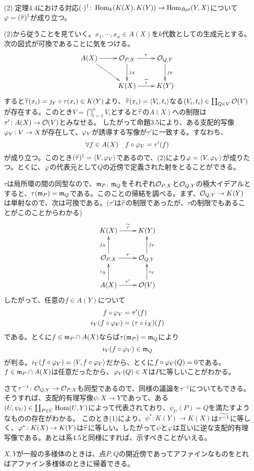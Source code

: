 \begin{description}
  (2) 定理4.4における対応$( \cdot )^{\dagger} \colon \operatorname{Hom}_{k}(K(X),K(Y)) \to \operatorname{Hom}_{Rat}(Y,X)$について${\varphi} = (\widetilde{\tau})^{\dagger} $が成り立つ。
\item[Step 2] (2)から従うことを見ていく。$x_1 , \cdots ,x_n \in A(X)$を$k$代数としての生成元とする。次の図式が可換であることに気をつける。
  \[
\xymatrix{
A(X) \ar[dr] \ar[r] & \calo_{P,X} \ar[d]^-{j_X} \ar[r]^-{\tau} & \calo_{Q,Y} \ar[d]^-{j_Y} \\
{} & K(X) \ar[r]^-{\wt{\tau}} & K(Y)
}
  \]
すると$\widetilde{\tau}(x_i) = j_Y \circ \tau(x_i) \in K(Y)$より、$\widetilde{\tau}(x_i) = \langle V_i, t_i \rangle$なる$(V_i, t_i) \in \coprod_{Q \in V} \mathcal{O}(V)$が存在する。このとき$V = \bigcap_{i=1}^n V_i$とすると$\widetilde{\tau}$の$A(X)$への制限は$\tau' \colon A(X) \to \mathcal{O}(V)$とみなせる。
したがって命題3.5により、ある支配的写像${\varphi}_V \colon V \to X$が存在して、${\varphi}_V$が誘導する写像が$\tau'$に一致する。すなわち、
\[
\forall f \in A(X) \quad f \circ {\varphi}_V = \tau'(f)
\]
が成り立つ。このとき$(\widetilde{\tau})^{\dagger} = \langle V,{\varphi}_V  \rangle$であるので、(2)により${\varphi} = \langle V,{\varphi}_V  \rangle$が成りたつ。とくに、${\varphi}$の代表元として$Q$の近傍で定義された射をとることができる。
\item[Step 3] $\tau$は局所環の間の同型なので、$\mathfrak{m}_P$, $\mathfrak{m}_Q$をそれぞれ$\mathcal{O}_{P,X}$と$\mathcal{O}_{Q,Y}$の極大イデアルとすると、$\tau(\mathfrak{m}_P) = \mathfrak{m}_Q$である。このことの帰結を調べる。まず、$\mathcal{O}_{Q,Y} \to K(Y)$は単射なので、次は可換である。($\tau'$は$\widetilde{\tau}$の制限であったが、$\tau$の制限でもあることがこのことからわかる)
\[
\xymatrix{
K(X) \ar[r]^-{\wt{\tau}} & K(Y) \\
\calo_{P,X} \ar[u]^-{j_X} \ar[r]^-{\tau} & \calo_{Q,Y} \ar[u]_-{j_Y} \\
A(X) \ar[u]^-{i_X} \ar[r]^-{\tau'} & \calo(V) \ar[u]_-{i_Y}
}
\]
したがって、任意の$f \in A(Y)$について
\begin{align*}
  f \circ {\varphi}_V &= \tau'(f) \\
  i_Y(f \circ {\varphi}_V) &= (\tau \circ i_X)(f)
\end{align*}
である。とくに$f \in \mathfrak{m}_P \cap A(X)$ならば$\tau(\mathfrak{m}_P) = \mathfrak{m}_Q$により
\[
  i_Y(f \circ {\varphi}_V) \in \mathfrak{m}_Q
\]
が判る。$  i_Y(f \circ {\varphi}_V) = \langle  V, f \circ {\varphi}_V \rangle$だから、とくに$f \circ {\varphi}_V(Q) = 0$である。$f \in \mathfrak{m}_P \cap A(X)$は任意だったから、${\varphi}_V(Q) \in X$は$P$に等しいことがわかる。

\item[Step 4]さて$\tau^{-1} \colon \mathcal{O}_{Q,Y} \to \mathcal{O}_{P,X}$も同型であるので、同様の議論を$\tau^{-1}$についてもできる。そうすれば、支配的有理写像$\psi \colon X \to Y$であって、ある$(U, \psi_U) \in \coprod_{P \in U} \operatorname{Hom}(U,Y)$によって代表されており、$\psi_U(P) = Q$を満たすようなものの存在がわかる。
このとき(1)により、$\psi^* \colon K(Y) \to K(X)$は$\widetilde{\tau^{-1}}$に等しく、${\varphi}^* \colon K(X) \to K(Y)$は$\widetilde{\tau}$に等しい。したがって$\psi$と${\varphi}$は互いに逆な支配的有理写像である。あとは系4.5と同様にすれば、示すべきことがいえる。
\item[Step 5] $X,Y$が一般の多様体のときは、点$P,Q$の開近傍であってアファインなものをとればアファイン多様体のときに帰着できる。
\end{description}



